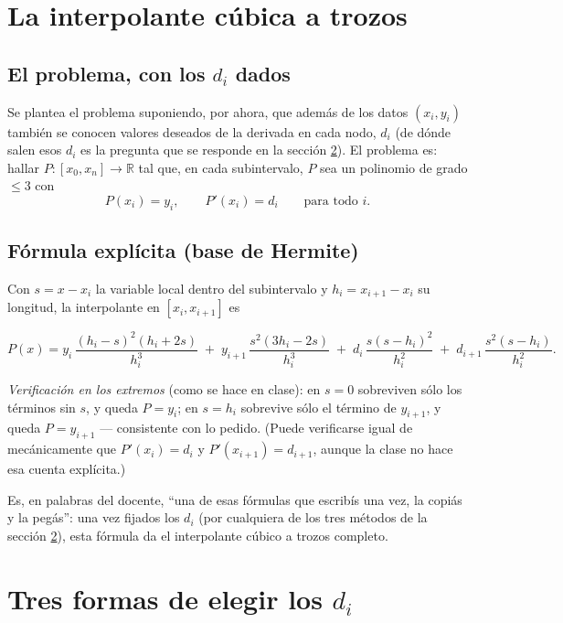 \documentclass[12pt,a4paper]{article}
\begin{document}
\section{La interpolante cúbica a trozos}

\subsection{El problema, con los \texorpdfstring{$d_i$}{di} dados}

Se plantea el problema suponiendo, por ahora, que además de los datos
$(x_i,y_i)$ también se conocen valores deseados de la derivada en cada
nodo, $d_i$ (de dónde salen esos $d_i$ es la pregunta que se responde en la
sección \ref{sec:tres-formas}). El problema es: hallar
$P:[x_0,x_n]\to\mathbb{R}$ tal que, en cada subintervalo, $P$ sea un
polinomio de grado $\le 3$ con
\[
P(x_i)=y_i, \qquad P'(x_i)=d_i \qquad \text{para todo } i.
\]

\subsection{Fórmula explícita (base de Hermite)}

Con $s = x-x_i$ la variable local dentro del subintervalo y $h_i =
x_{i+1}-x_i$ su longitud, la interpolante en $[x_i,x_{i+1}]$ es
\begin{keybox}
\[
P(x) = y_i\,\frac{(h_i-s)^2(h_i+2s)}{h_i^3}
     \;+\; y_{i+1}\,\frac{s^2(3h_i-2s)}{h_i^3}
     \;+\; d_i\,\frac{s(s-h_i)^2}{h_i^2}
     \;+\; d_{i+1}\,\frac{s^2(s-h_i)}{h_i^2}.
\]
\end{keybox}

\noindent\textit{Verificación en los extremos} (como se hace en clase): en
$s=0$ sobreviven sólo los términos sin $s$, y queda $P=y_i$; en $s=h_i$
sobrevive sólo el término de $y_{i+1}$, y queda $P=y_{i+1}$ --- consistente
con lo pedido. (Puede verificarse igual de mecánicamente que
$P'(x_i)=d_i$ y $P'(x_{i+1})=d_{i+1}$, aunque la clase no hace esa cuenta
explícita.)

Es, en palabras del docente, ``una de esas fórmulas que escribís una vez,
la copiás y la pegás'': una vez fijados los $d_i$ (por cualquiera de los
tres métodos de la sección \ref{sec:tres-formas}), esta fórmula da el
interpolante cúbico a trozos completo.

\section{Tres formas de elegir los \texorpdfstring{$d_i$}{di}}
\label{sec:tres-formas}
\end{document}
